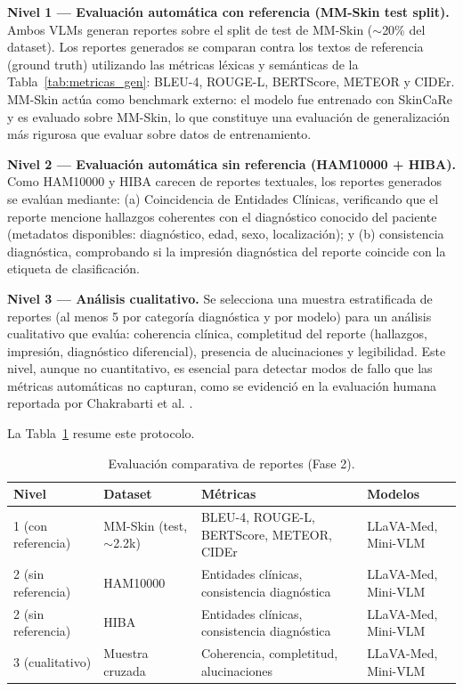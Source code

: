 \documentclass[11pt, a4paper]{article}
\begin{document}
\textbf{Nivel 1 — Evaluación automática con referencia (MM-Skin test split).} Ambos VLMs generan reportes sobre el split de test de MM-Skin ($\sim$20\% del dataset). Los reportes generados se comparan contra los textos de referencia (ground truth) utilizando las métricas léxicas y semánticas de la Tabla~\ref{tab:metricas_gen}: BLEU-4, ROUGE-L, BERTScore, METEOR y CIDEr. MM-Skin actúa como benchmark externo: el modelo fue entrenado con SkinCaRe y es evaluado sobre MM-Skin, lo que constituye una evaluación de generalización más rigurosa que evaluar sobre datos de entrenamiento.

\textbf{Nivel 2 — Evaluación automática sin referencia (HAM10000 + HIBA).} Como HAM10000 y HIBA carecen de reportes textuales, los reportes generados se evalúan mediante: (a) Coincidencia de Entidades Clínicas, verificando que el reporte mencione hallazgos coherentes con el diagnóstico conocido del paciente (metadatos disponibles: diagnóstico, edad, sexo, localización); y (b) consistencia diagnóstica, comprobando si la impresión diagnóstica del reporte coincide con la etiqueta de clasificación.

\textbf{Nivel 3 — Análisis cualitativo.} Se selecciona una muestra estratificada de reportes (al menos 5 por categoría diagnóstica y por modelo) para un análisis cualitativo que evalúa: coherencia clínica, completitud del reporte (hallazgos, impresión, diagnóstico diferencial), presencia de alucinaciones y legibilidad. Este nivel, aunque no cuantitativo, es esencial para detectar modos de fallo que las métricas automáticas no capturan, como se evidenció en la evaluación humana reportada por Chakrabarti et al. \cite{chakrabarti_automated_2025}.

La Tabla~\ref{tab:eval_reportes} resume este protocolo.

\begin{table}[H]
\centering
\caption{Evaluación comparativa de reportes (Fase 2).}
\label{tab:eval_reportes}
\small
\begin{tabular}{@{}llll@{}}
\toprule
\textbf{Nivel} & \textbf{Dataset} & \textbf{Métricas} & \textbf{Modelos} \\
\midrule
1 (con referencia) & MM-Skin (test, $\sim$2.2k) & BLEU-4, ROUGE-L, BERTScore, METEOR, CIDEr & LLaVA-Med, Mini-VLM \\
2 (sin referencia) & HAM10000 & Entidades clínicas, consistencia diagnóstica & LLaVA-Med, Mini-VLM \\
2 (sin referencia) & HIBA & Entidades clínicas, consistencia diagnóstica & LLaVA-Med, Mini-VLM \\
3 (cualitativo) & Muestra cruzada & Coherencia, completitud, alucinaciones & LLaVA-Med, Mini-VLM \\
\bottomrule
\end{tabular}
\end{table}
\end{document}
